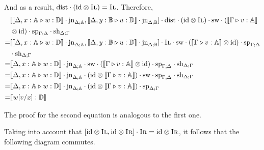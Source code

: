 And as a result, $ \text{dist}  \cdot (\text{id} \otimes \textsc{Il}) = \textsc{Il}$. Therefore,
\begin{equation*}
  \begin{split}
    & [\llbracket\Delta, x: \mathbb{A} \triangleright w: \mathbb{D}\rrbracket \cdot \text{jn}_{\Delta;\mathbb{A}} ,\llbracket\Delta, y: \mathbb{B} \triangleright u: \mathbb{D}\rrbracket \cdot \text{jn}_{\Delta;\mathbb{B}}] \cdot \text{dist}  \cdot (\text{id} \otimes \textsc{Il}) \cdot   \text{sw} \cdot(\llbracket\Gamma \triangleright v: \mathbb{A} \rrbracket\\\ 
    & \otimes  \text{id})  \cdot \text{sp}_{\Gamma;\Delta} \cdot \text{sh}_{\Delta; \Gamma} \\
    = & [\llbracket\Delta, x: \mathbb{A} \triangleright w: \mathbb{D}\rrbracket\cdot \text{jn}_{\Delta;\mathbb{A}},\llbracket\Delta, y: \mathbb{B} \triangleright u: \mathbb{D}\rrbracket \cdot \text{jn}_{\Delta;\mathbb{B}}] \cdot \textsc{Il} \cdot   \text{sw} \cdot(\llbracket\Gamma \triangleright v: \mathbb{A} \rrbracket \otimes  \text{id}) \cdot \text{sp}_{\Gamma;\Delta}  \\
    & \cdot \text{sh}_{\Delta; \Gamma} \\
    = & \llbracket\Delta, x: \mathbb{A} \triangleright w: \mathbb{D}\rrbracket \cdot \text{jn}_{\Delta;\mathbb{A}}  \cdot   \text{sw} \cdot(\llbracket\Gamma \triangleright v: \mathbb{A} \rrbracket \otimes  \text{id}) \cdot \text{sp}_{\Gamma;\Delta} \cdot \text{sh}_{\Delta; \Gamma} \\
    = & \llbracket\Delta, x: \mathbb{A} \triangleright w: \mathbb{D}\rrbracket \cdot \text{jn}_{\Delta;\mathbb{A}} \cdot( \text{id} \otimes \llbracket\Gamma \triangleright v: \mathbb{A} \rrbracket ) \cdot    \text{sw}  \cdot \text{sp}_{\Gamma;\Delta}  \cdot \text{sh}_{\Delta; \Gamma} \\
    = & \llbracket\Delta, x: \mathbb{A} \triangleright w: \mathbb{D}\rrbracket \cdot \text{jn}_{\Delta;\mathbb{A}} \cdot( \text{id} \otimes \llbracket\Gamma \triangleright v: \mathbb{A} \rrbracket ) \cdot \text{sp}_{\Delta;\Gamma}\\
    = & \llbracket w[v/x] : \mathbb{D} \rrbracket
  \end{split}
\end{equation*}

\vspace{10pt}

The proof for the second equation is analogous to the first one.

Taking into account that $[\text{id} \otimes \textsc{Il},\text{id} \otimes \textsc{Ir}] \cdot \textsc{Ir} = \text{id} \otimes \textsc{Ir}$, it follows that the following diagram commutes.

